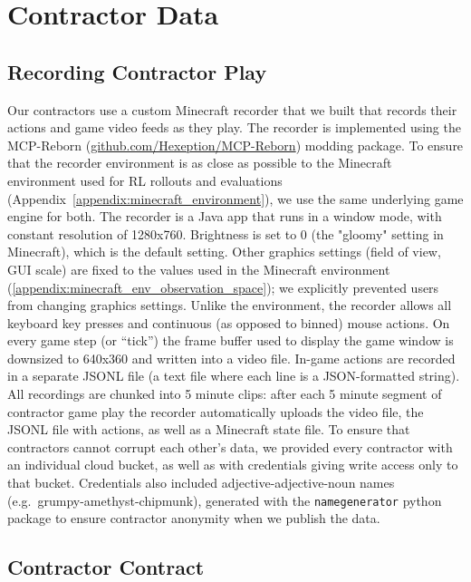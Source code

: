\section{Contractor Data}
\label{appendix:contractor_data}

\subsection{Recording Contractor Play}
Our contractors use a custom Minecraft recorder that we built that records their actions and game video feeds as they play. The recorder is implemented using the MCP-Reborn (\href{https://github.com/Hexeption/MCP-Reborn}{github.com/Hexeption/MCP-Reborn}) modding package. To ensure that the recorder environment is as close as possible to the Minecraft environment used for RL rollouts and evaluations (Appendix~\ref{appendix:minecraft_environment}), we use the same underlying game engine for both. The recorder is a Java app that runs in a window mode, with constant resolution of 1280x760. Brightness is set to 0 (the "gloomy" setting in Minecraft), which is the default setting. Other graphics settings (field of view, GUI scale) are fixed to the values used in the Minecraft environment (\ref{appendix:minecraft_env_observation_space}); we explicitly prevented users from changing graphics settings.
Unlike the environment, the recorder allows all keyboard key presses and continuous (as opposed to binned) mouse actions. On every game step (or ``tick'') the frame buffer used to display the game window is downsized to 640x360 and written into a video file. In-game actions are recorded in a separate JSONL file (a text file where each line is a JSON-formatted string). All recordings are chunked into 5 minute clips: after each 5 minute segment of contractor game play the recorder automatically uploads the video file, the JSONL file with actions, as well as a Minecraft state file. To ensure that contractors cannot corrupt each other's data, we provided every contractor with an individual cloud bucket, as well as with credentials giving write access only to that bucket. Credentials also included adjective-adjective-noun names (e.g.\ grumpy-amethyst-chipmunk), generated with the \texttt{namegenerator} python package to ensure contractor anonymity when we publish the data.

\subsection{Contractor Contract}
\label{appendix:contractor_contract}


